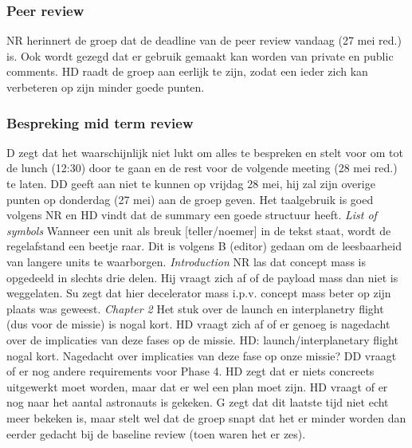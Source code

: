\subsubsection{Peer review}
NR herinnert de groep dat de deadline van de peer review vandaag (27 mei red.) is. Ook wordt gezegd dat er gebruik gemaakt kan worden van private en public comments. HD raadt de groep aan eerlijk te zijn, zodat een ieder zich kan verbeteren op zijn minder goede punten.

\subsubsection{Bespreking mid term review}
D zegt dat het waarschijnlijk niet lukt om alles te bespreken en stelt voor om tot de lunch (12:30) door te gaan en de rest voor de volgende meeting (28 mei red.) te laten. DD geeft aan niet te kunnen op vrijdag 28 mei, hij zal zijn overige punten op donderdag (27 mei) aan de groep geven. 
\newline
Het taalgebruik is goed volgens NR en HD vindt dat de summary een goede structuur heeft.
\newline\newline
\textit{List of symbols}\newline
Wanneer een unit als breuk [teller/noemer] in de tekst staat, wordt de regelafstand een beetje raar. Dit is volgens B (editor) gedaan om de leesbaarheid van langere units te waarborgen. 
\newline\newline
\textit{Introduction}\newline
NR las dat concept mass is opgedeeld in slechts drie delen. Hij vraagt zich af of de payload mass dan niet is weggelaten. Su zegt dat hier decelerator mass i.p.v. concept mass beter op zijn plaats was geweest.
\newline\newline
\textit{Chapter 2}\newline
Het stuk over de launch en interplanetry flight (dus voor de missie) is nogal kort. HD vraagt zich af of er genoeg is nagedacht over de implicaties van deze fases op de missie.
HD: launch/interplanetary flight nogal kort. Nagedacht over implicaties van deze fase op onze missie?\newline
DD vraagt of er nog andere requirements voor Phase 4. HD zegt dat er niets concreets uitgewerkt moet worden, maar dat er wel een plan moet zijn.\newline
HD vraagt of er nog naar het aantal astronauts is gekeken. G zegt dat dit laatste tijd niet echt meer bekeken is, maar stelt wel dat de groep snapt dat het er minder worden dan eerder gedacht bij de baseline review (toen waren het er zes).\newline
